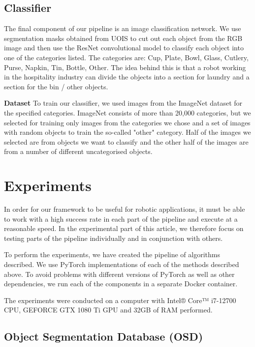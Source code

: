 \documentclass[10pt,twocolumn,letterpaper]{article}
\begin{document}

\subsection{Classifier}
The final component of our pipeline is an image classification network. We use segmentation masks obtained from UOIS to cut out each object from the RGB image and then use the ResNet convolutional model to classify each object into one of the categories listed. The categories are: Cup, Plate, Bowl, Glass, Cutlery, Purse, Napkin, Tin, Bottle, Other. The idea behind this is that a robot working in the hospitality industry can divide the objects into a section for laundry and a section for the bin / other objects.

\textbf{Dataset}
To train our classifier, we used images from the ImageNet dataset for the specified categories. ImageNet consists of more than 20,000 categories, but we selected for training only images from the categories we chose and a set of images with random objects to train the so-called "other" category. Half of the images we selected are from objects we want to classify and the other half of the images are from a number of different uncategorised objects.


\section{Experiments}
In order for our framework to be useful for robotic applications, it must be able to work with a high success rate in each part of the pipeline and execute at a reasonable speed. In the experimental part of this article, we therefore focus on testing parts of the pipeline individually and in conjunction with others.

To perform the experiments, we have created the pipeline of algorithms described. We use PyTorch \cite{Paszke_Gross_Massa_Lerer_Bradbury_Chanan_Killeen_Lin_Gimelshein_Antiga_et} implementations of each of the methods described above. To avoid problems with different versions of PyTorch as well as other dependencies, we run each of the components in a separate Docker container.

The experiments were conducted on a computer with Intel® Core™ i7-12700 CPU,
GEFORCE GTX 1080 Ti GPU and 32GB of RAM performed.

\subsection{Object Segmentation Database (OSD)}
\end{document}
